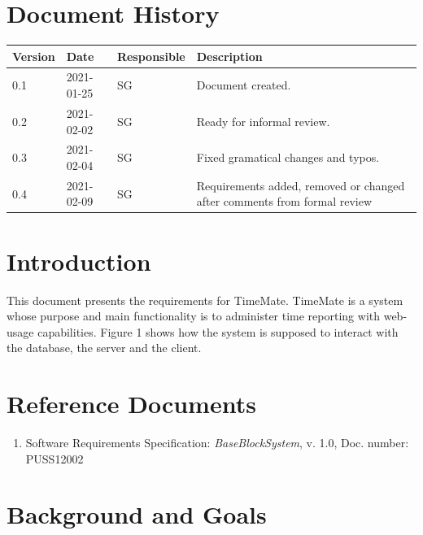 \documentclass{article}
\date {#1}
\title {
    \documentNumber {01}    
    
    \documentVersion {0.4}
    
    \documentTitle {Software Requirements Specification}
    \documentGroup {2}
    
    \documentResponsible {System Group}
    \documentAuthors {System Group, Development Group}
    
    \documentDate {2021-02-09}
}
\begin{document}
\maketitle
\thispagestyle{empty}

\newpage

\tableofcontents

\newpage

\section{Document History}
\begin{tabular}{ l | l | l | l }
    Version & Date & Responsible & Description \\
    \hline
    0.1 & 2021-01-25 & SG & Document created. \\
    0.2 & 2021-02-02 & SG & Ready for informal review. \\
    0.3 & 2021-02-04 & SG & Fixed gramatical changes and typos. \\
    0.4 & 2021-02-09 & SG & Requirements added, removed or changed after comments from formal review \\
\end{tabular}

\section{Introduction}

This document presents the requirements for TimeMate. TimeMate is a system whose purpose and main functionality is to administer time reporting with web-usage capabilities. Figure 1 shows how the system is supposed to interact with the database, the server and the client.


\section{Reference Documents}

\begin{enumerate}
  \item Software Requirements Specification: \emph{BaseBlockSystem}, v. 1.0, Doc. number: PUSS12002
  
\end{enumerate}

\section{Background and Goals}
\end{document}

